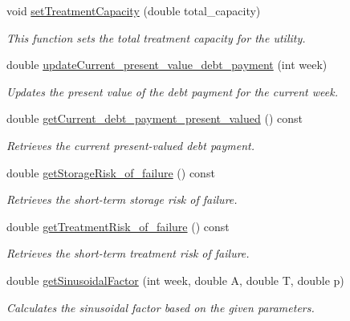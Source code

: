 \begin{DoxyCompactItemize}
$$void \mbox{\hyperlink{classUtility_ae2dd2175d9fe1d71ea1f1e8b43a21148}{set\+Treatment\+Capacity}} (double total\+\_\+capacity)
\begin{DoxyCompactList}\small\item\em This function sets the total treatment capacity for the utility. \end{DoxyCompactList}\item 
double \mbox{\hyperlink{classUtility_ab920387a318f7d7956da5e92582a58a3}{update\+Current\+\_\+present\+\_\+value\+\_\+debt\+\_\+payment}} (int week)
\begin{DoxyCompactList}\small\item\em Updates the present value of the debt payment for the current week. \end{DoxyCompactList}\item 
double \mbox{\hyperlink{classUtility_a407debda53abcf80ebd290414c1bf5bc}{get\+Current\+\_\+debt\+\_\+payment\+\_\+present\+\_\+valued}} () const
\begin{DoxyCompactList}\small\item\em Retrieves the current present-\/valued debt payment. \end{DoxyCompactList}\item 
double \mbox{\hyperlink{classUtility_aaaa05e97f2d33cf7a28b5c91ec253026}{get\+Storage\+Risk\+\_\+of\+\_\+failure}} () const
\begin{DoxyCompactList}\small\item\em Retrieves the short-\/term storage risk of failure. \end{DoxyCompactList}\item 
double \mbox{\hyperlink{classUtility_a1fd8aedeaf56d674fd024dac1f11b20c}{get\+Treatment\+Risk\+\_\+of\+\_\+failure}} () const
\begin{DoxyCompactList}\small\item\em Retrieves the short-\/term treatment risk of failure. \end{DoxyCompactList}\item 
double \mbox{\hyperlink{classUtility_affbfd106c7b5cdf6703d01d6ad838fde}{get\+Sinusoidal\+Factor}} (int week, double A, double T, double p)
\begin{DoxyCompactList}\small\item\em Calculates the sinusoidal factor based on the given parameters. \end{DoxyCompactList}\end{DoxyCompactItemize}

